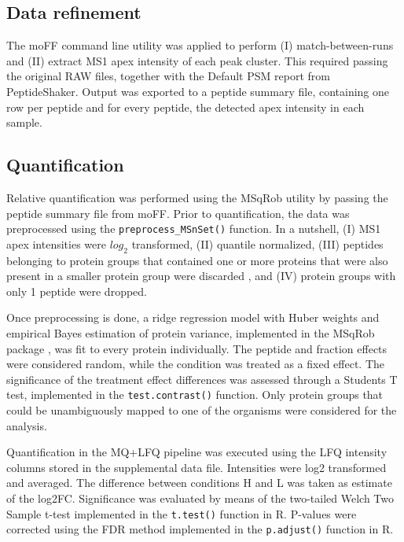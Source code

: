 \subsection{Data refinement}

The moFF command line utility \cite{Argentini2016} was applied to perform (I) match-between-runs and (II) extract MS1 apex intensity of each peak cluster. This required passing the original RAW files, together with the Default PSM report from PeptideShaker. Output was exported to a peptide summary file, containing  one row per peptide and for every peptide, the detected apex intensity in each sample.

\subsection{Quantification}

Relative quantification was performed using the MSqRob utility by passing the peptide summary file from moFF. Prior to quantification, the data was preprocessed using the \texttt{preprocess\_MSnSet()} function. In a nutshell, (I) MS1 apex intensities were $log_2$ transformed, (II) quantile normalized, (III) peptides belonging to protein groups that contained one or more proteins that were also present in a smaller protein group were discarded \cite{Goeminne2016}, and (IV) protein groups with only 1 peptide were dropped.

Once preprocessing is done, a ridge regression model with Huber weights and empirical Bayes estimation of protein variance, implemented in the MSqRob package \cite{Goeminne2016}, was fit to every protein individually. The peptide and fraction effects were considered random, while the condition was treated as a fixed effect. The significance of the treatment effect differences was assessed through a Student\textquotesingle s T test, implemented in the \texttt{test.contrast()} function. Only protein groups that could be unambiguously mapped to one of the organisms were considered for the analysis.

Quantification in the MQ+LFQ pipeline was executed using the LFQ intensity columns stored in the supplemental data file. Intensities were log2 transformed and averaged. The difference between conditions H and L was taken as estimate of the log2FC. Significance was evaluated by means of the two-tailed Welch Two Sample t-test implemented in the \texttt{t.test()} function in R. P-values were corrected using the FDR method implemented in the \texttt{p.adjust()} function in R.


